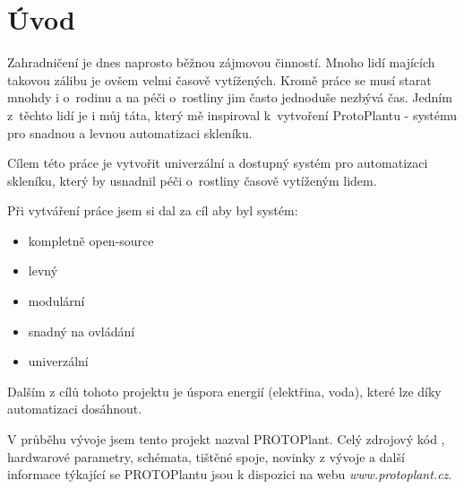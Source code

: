 \chapter*{Úvod}

Zahradničení je dnes naprosto běžnou zájmovou činností. Mnoho lidí majících takovou zálibu je ovšem velmi časově vytížených. Kromě práce se musí starat mnohdy i o~rodinu a na péči o~rostliny jim často jednoduše nezbývá čas. Jedním z~těchto lidí je i můj táta, který mě inspiroval k~vytvoření ProtoPlantu - systému pro snadnou a levnou automatizaci skleníku.

Cílem této práce je vytvořit univerzální a dostupný systém pro automatizaci skleníku, který by usnadnil péči o~rostliny časově vytíženým lidem. 

Při vytváření práce jsem si dal za cíl aby byl systém:
\begin{itemize}
    \item kompletně open-source
    \item levný
    \item modulární
    \item snadný na ovládání
    \item univerzální
\end{itemize}

Dalším z cílů tohoto projektu je úspora energií (elektřina, voda), které lze díky automatizaci dosáhnout.

V průběhu vývoje jsem tento projekt nazval PROTOPlant.
Celý zdrojový kód , hardwarové parametry, schémata, tištěné spoje, novinky z vývoje a další informace týkající se PROTOPlantu jsou k dispozici na webu \textit{www.protoplant.cz}.
\newpage
